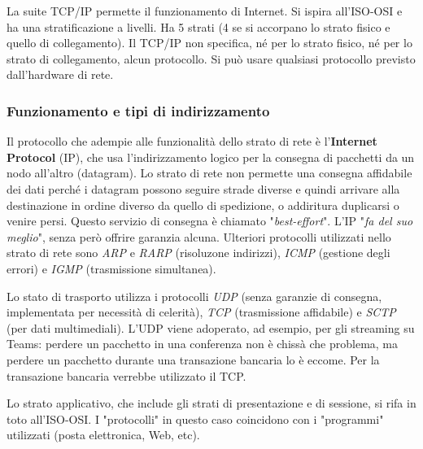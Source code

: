         La suite TCP/IP permette il funzionamento di Internet. Si ispira all'ISO-OSI e ha una stratificazione a livelli. Ha 5 strati (4 se si accorpano lo strato fisico e quello di collegamento). Il TCP/IP non specifica, né per lo strato fisico, né per lo strato di collegamento, alcun protocollo. Si può usare qualsiasi protocollo previsto dall'hardware di rete. 
    
    \subsubsection{Funzionamento e tipi di indirizzamento}
        Il protocollo che adempie alle funzionalità dello strato di rete è l'\textbf{Internet Protocol} (IP), che usa l'indirizzamento logico per la consegna di pacchetti da un nodo all'altro (datagram). Lo strato di rete non permette una consegna affidabile dei dati perché i datagram possono seguire strade diverse e quindi arrivare alla destinazione in ordine diverso da quello di spedizione, o addiritura duplicarsi o venire persi. Questo servizio di consegna è chiamato "\textit{best-effort}".
        L'IP "\textit{fa del suo meglio}", senza però offrire garanzia alcuna. Ulteriori protocolli utilizzati nello strato di rete sono \textit{ARP} e \textit{RARP} (risoluzone indirizzi), \textit{ICMP} (gestione degli errori) e \textit{IGMP} (trasmissione simultanea).
    
        \vspace{3mm}
    
        Lo stato di trasporto utilizza i protocolli \textit{UDP} (senza garanzie di consegna, implementata per necessità di celerità), \textit{TCP} (trasmissione affidabile) e \textit{SCTP} (per dati multimediali). L'UDP viene adoperato, ad esempio, per gli streaming su Teams: perdere un pacchetto in una conferenza non è chissà che problema, ma perdere un pacchetto durante una transazione bancaria lo è eccome. Per la transazione bancaria verrebbe utilizzato il TCP.
    
        \vspace{3mm}
    
        Lo strato applicativo, che include gli strati di presentazione e di sessione, si rifa in toto all'ISO-OSI. I "protocolli" in questo caso coincidono con i "programmi" utilizzati (posta elettronica, Web, etc).
    
        \vspace{3mm}
    
